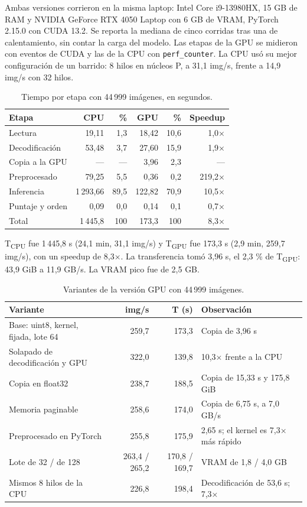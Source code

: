 \documentclass[11pt,letterpaper]{article}
\begin{document}
Ambas versiones corrieron en la misma laptop: Intel Core i9-13980HX, 15 GB de RAM y NVIDIA GeForce RTX 4050 Laptop con 6 GB de VRAM, PyTorch 2.15.0 con CUDA 13.2. Se reporta la mediana de cinco corridas tras una de calentamiento, sin contar la carga del modelo. Las etapas de la GPU se midieron con eventos de CUDA y las de la CPU con \texttt{perf\_counter}. La CPU usó su mejor configuración de un barrido: 8 hilos en núcleos P, a 31,1 img/s, frente a 14,9 img/s con 32 hilos.

\begin{table}[h]
\centering
\caption{Tiempo por etapa con 44\,999 imágenes, en segundos.}
\begin{tabular}{|l|r|r|r|r|r|}
\hline
Etapa & CPU & \% & GPU & \% & Speedup \\ \hline
Lectura & 19,11 & 1,3 & 18,42 & 10,6 & 1,0× \\ \hline
Decodificación & 53,48 & 3,7 & 27,60 & 15,9 & 1,9× \\ \hline
Copia a la GPU & — & — & 3,96 & 2,3 & — \\ \hline
Preprocesado & 79,25 & 5,5 & 0,36 & 0,2 & 219,2× \\ \hline
Inferencia & 1\,293,66 & 89,5 & 122,82 & 70,9 & 10,5× \\ \hline
Puntaje y orden & 0,09 & 0,0 & 0,14 & 0,1 & 0,7× \\ \hline
Total & 1\,445,8 & 100 & 173,3 & 100 & 8,3× \\ \hline
\end{tabular}
\end{table}

T\textsubscript{CPU} fue 1\,445,8 s (24,1 min, 31,1 img/s) y T\textsubscript{GPU} fue 173,3 s (2,9 min, 259,7 img/s), con un speedup de 8,3×. La transferencia tomó 3,96 s, el 2,3 \% de T\textsubscript{GPU}: 43,9 GiB a 11,9 GB/s. La VRAM pico fue de 2,5 GB.

\begin{table}[h]
\centering
\caption{Variantes de la versión GPU con 44\,999 imágenes.}
\begin{tabularx}{\linewidth}{|l|r|r|X|}
\hline
Variante & img/s & T (s) & Observación \\ \hline
Base: uint8, kernel, fijada, lote 64 & 259,7 & 173,3 & Copia de 3,96 s \\ \hline
Solapado de decodificación y GPU & 322,0 & 139,8 & 10,3× frente a la CPU \\ \hline
Copia en float32 & 238,7 & 188,5 & Copia de 15,33 s y 175,8 GiB \\ \hline
Memoria paginable & 258,6 & 174,0 & Copia de 6,75 s, a 7,0 GB/s \\ \hline
Preprocesado en PyTorch & 255,8 & 175,9 & 2,65 s; el kernel es 7,3× más rápido \\ \hline
Lote de 32 / de 128 & 263,4 / 265,2 & 170,8 / 169,7 & VRAM de 1,8 / 4,0 GB \\ \hline
Mismos 8 hilos de la CPU & 226,8 & 198,4 & Decodificación de 53,6 s; 7,3× \\ \hline
\end{tabularx}
\end{table}
\end{document}

